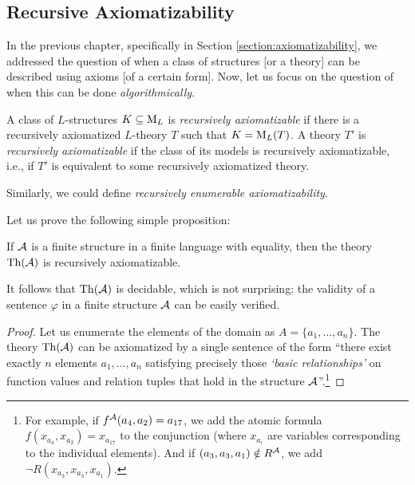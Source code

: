  
\subsection{Recursive Axiomatizability}

In the previous chapter, specifically in Section \ref{section:axiomatizability}, we addressed the question of when a class of structures [or a theory] can be described using axioms [of a certain form]. Now, let us focus on the question of when this can be done \emph{algorithmically}.

\begin{definition}
A class of $L$-structures $K \subseteq \operatorname{M}_L$ is \emph{recursively axiomatizable} if there is a recursively axiomatized $L$-theory $T$ such that $K = \operatorname{M}_L(T)$. A theory $T'$ is \emph{recursively axiomatizable} if the class of its models is recursively axiomatizable, i.e., if $T'$ is equivalent to some recursively axiomatized theory.
\end{definition}
\begin{remark}
    Similarly, we could define \emph{recursively enumerable axiomatizability}.
\end{remark}

Let us prove the following simple proposition:

\begin{proposition}
    If $\mathcal{A}$ is a finite structure in a finite language with equality, then the theory $\operatorname{Th}(\mathcal{A})$ is recursively axiomatizable.
\end{proposition}
\begin{remark}
    It follows that $\operatorname{Th}(\mathcal{A})$ is decidable, which is not surprising: the validity of a sentence $\varphi$ in a finite structure $\mathcal{A}$ can be easily verified.
\end{remark}
\begin{proof}
    Let us enumerate the elements of the domain as $A = \{a_1, \dots, a_n\}$. The theory $\operatorname{Th}(\mathcal{A})$ can be axiomatized by a single sentence of the form ``there exist exactly $n$ elements $a_1, \dots, a_n$ satisfying precisely those \emph{`basic relationships'} on function values and relation tuples that hold in the structure $\mathcal{A}$''.\footnote{For example, if $f^{\mathcal{A}}(a_4, a_2) = a_{17}$, we add the atomic formula $f(x_{a_4}, x_{a_2}) = x_{a_{17}}$ to the conjunction (where $x_{a_i}$ are variables corresponding to the individual elements). And if $(a_3, a_3, a_1) \notin R^{\mathcal{A}}$, we add $\neg R(x_{a_3}, x_{a_3}, x_{a_1})$.}    
\end{proof}
 
